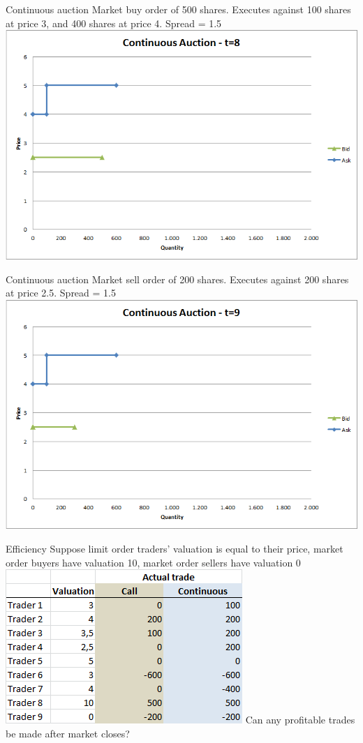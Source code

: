 \begin{frame}{Continuous auction}
	Market buy order of 500 shares. Executes against 100 shares at price 3, and 400 shares at price 4. Spread = 1.5
	\center
	\includegraphics[width=.75\linewidth]{pics/Continuous_t8}
\end{frame}


\begin{frame}{Continuous auction}
	Market sell order of 200 shares. Executes against 200 shares at price 2.5. Spread = 1.5
	\center
	\includegraphics[width=.75\linewidth]{pics/Continuous_t9}
\end{frame}


\begin{frame}{Efficiency}
	Suppose limit order traders' valuation is equal to their price, market order buyers have valuation 10, market order sellers have valuation 0
	\quad
	\center
	\includegraphics[width=.5\linewidth]{pics/Efficiency}
	\quad
	Can any profitable trades be made after market closes?
\end{frame}



